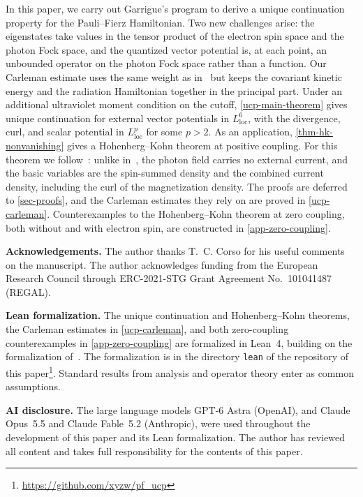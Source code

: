 \documentclass[final,reqno]{amsart}
\theoremstyle{remark}
\begin{document}
In this paper, we carry out Garrigue's program to derive a unique
continuation property for the Pauli--Fierz Hamiltonian.  Two new challenges arise: the eigenstates take values in the tensor product of
the electron spin space and the photon Fock space, and the quantized
vector potential is, at each point, an unbounded operator on the photon
Fock space rather than a function.  Our Carleman estimate uses
the same weight as
in~\cite{garrigue2018unique,garrigue2020unique} but keeps the covariant
kinetic energy and the
radiation Hamiltonian together in the principal part.  Under an
additional ultraviolet moment condition on the cutoff,
\cref{ucp-main-theorem} gives unique continuation for external vector potentials in
$L^6_\mathrm{loc}$, with the divergence, curl, and scalar potential in
$L^p_\mathrm{loc}$ for some $p>2$.  As an application,
\cref{thm-hk-nonvanishing} gives a Hohenberg--Kohn
theorem at positive coupling.  For this theorem we
follow~\cite{Q}: unlike in~\cite{ruggenthaler2015ground}, the photon
field carries no external current, and the basic variables are the
spin-summed density and the combined current density, including the
curl of the magnetization density.
The proofs are deferred to \cref{sec-proofs}, and the Carleman
estimates they rely on are proved in \cref{ucp-carleman}.
Counterexamples to the Hohenberg--Kohn theorem at zero coupling, both
without and with electron spin, are constructed in
\cref{app-zero-coupling}.

\medskip
\noindent\textbf{Acknowledgements.}
The author thanks T.~C. Corso for his useful comments on the
manuscript.  The author acknowledges funding from the European Research Council
through ERC-2021-STG Grant Agreement No.~101041487 \mbox{(REGAL)}.

\medskip
\noindent\textbf{Lean formalization.}
The unique continuation and Hohenberg--Kohn theorems, the Carleman
estimates in \cref{ucp-carleman}, and both zero-coupling
counterexamples in \cref{app-zero-coupling} are formalized in Lean~4,
building on the formalization of~\cite{Q}.  The formalization is in the
directory \texttt{lean} of the repository of this
paper\footnote{\url{https://github.com/xyzw/pf_ucp}}.  Standard results from
analysis and operator theory enter as common assumptions.

\enlargethispage{2\baselineskip}
\medskip
\noindent\textbf{AI disclosure.}
The large language models GPT-6 Astra (OpenAI), and Claude Opus~5.5
and Claude Fable~5.2 (Anthropic), were used throughout the development of this paper and its
Lean formalization.  The author has reviewed all content and takes full
responsibility for the contents of this paper.
\end{document}
